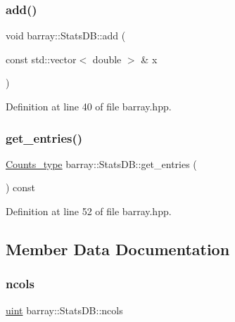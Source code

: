 \subsubsection{\texorpdfstring{add()}{add()}}
{\footnotesize\ttfamily void barray\+::\+Stats\+D\+B\+::add (\begin{DoxyParamCaption}\item[{const std\+::vector$<$ double $>$ \&}]{x }\end{DoxyParamCaption})\hspace{0.3cm}{\ttfamily [inline]}}



Definition at line 40 of file barray.\+hpp.

\mbox{\label{classbarray_1_1_stats_d_b_ab1a4d57ee2be6d87d9b4acfb794dd768}} 
\subsubsection{\texorpdfstring{get\+\_\+entries()}{get\_entries()}}
{\footnotesize\ttfamily \hyperlink{namespacebarray_a402b1982cc07118fb03b259b3fbe6b13}{Counts\+\_\+type} barray\+::\+Stats\+D\+B\+::get\+\_\+entries (\begin{DoxyParamCaption}{ }\end{DoxyParamCaption}) const\hspace{0.3cm}{\ttfamily [inline]}}



Definition at line 52 of file barray.\+hpp.



\subsection{Member Data Documentation}
\mbox{\label{classbarray_1_1_stats_d_b_a719cd8317c2b59c38cc5b09277ab0bc2}} 
\subsubsection{\texorpdfstring{ncols}{ncols}}
{\footnotesize\ttfamily \hyperlink{namespacebarray_af9756a31953db233f80a9cfe1ef31c32}{uint} barray\+::\+Stats\+D\+B\+::ncols}



